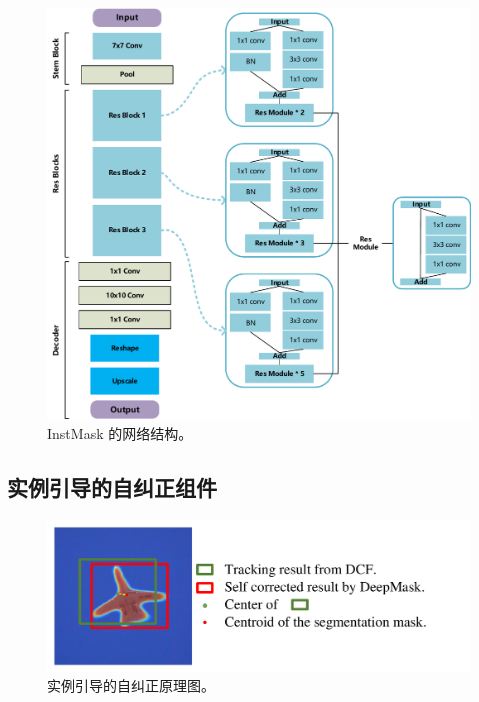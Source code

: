 \begin{figure}[t]
    \centering
    \includegraphics[width=1.0\textwidth]{Img/IGCF/net.pdf}
    \caption{InstMask 的网络结构。}
    \label{fig:net}
\end{figure}

\subsection{实例引导的自纠正组件} \label{sec:cog}

\begin{figure}[t]
    \centering
    \includegraphics[width=1.0\textwidth]{Img/IGCF/cog_arch.pdf}
    \caption{实例引导的自纠正原理图。}
    \label{fig:net}
\end{figure}

